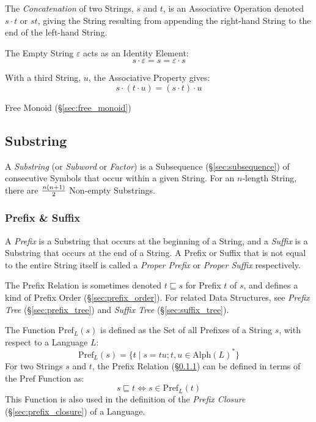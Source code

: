 The \emph{Concatenation} of two Strings, $s$ and $t$, is an Associative
Operation denoted $s \cdot t$ or $st$, giving the String resulting from
appending the right-hand String to the end of the left-hand String.

The Empty String $\varepsilon$ acts as an Identity Element:
\[
  s \cdot \varepsilon = s = \varepsilon \cdot s
\]

With a third String, $u$, the Associative Property gives:
\[
  s \cdot (t \cdot u) = (s \cdot t) \cdot u
\]

Free Monoid (\S\ref{sec:free_monoid})



\subsection{Substring}\label{sec:substring}

A \emph{Substring} (or \emph{Subword} or \emph{Factor}) is a Subsequence
(\S\ref{sec:subsequence}) of consecutive Symbols that occur within a given
String. For an $n$-length String, there are $n(n+1) \over 2$ Non-empty
Substrings.



\subsubsection{Prefix \& Suffix}\label{sec:prefix_suffix}

A \emph{Prefix} is a Substring that occurs at the beginning of a String, and a
\emph{Suffix} is a Substring that occurs at the end of a String. A Prefix or
Suffix that is not equal to the entire String itself is called a \emph{Proper
  Prefix} or \emph{Proper Suffix} respectively.

The Prefix Relation is sometimes denoted $t \sqsubseteq s$ for Prefix $t$ of
$s$, and defines a kind of Prefix Order (\S\ref{sec:prefix_order}). For related
Data Structures, see \emph{Prefix Tree} (\S\ref{sec:prefix_tree}) and
\emph{Suffix Tree} (\S\ref{sec:suffix_tree}).

The Function $\mathrm{Pref}_L(s)$ is defined as the Set of all Prefixes of a
String $s$, with respect to a Language $L$:
\[
  \mathrm{Pref}_L(s) =
    \{ t\;|\;s = tu; t,u \in \mathrm{Alph}(L)^* \}
\]
For two Strings $s$ and $t$, the Prefix Relation (\S\ref{sec:prefix_suffix}) can
be defined in terms of the $\mathrm{Pref}$ Function as:
\[
  s \sqsubseteq t \Leftrightarrow s \in \mathrm{Pref}_L(t)
\]
This Function is also used in the definition of the \emph{Prefix Closure}
(\S\ref{sec:prefix_closure}) of a Language.



